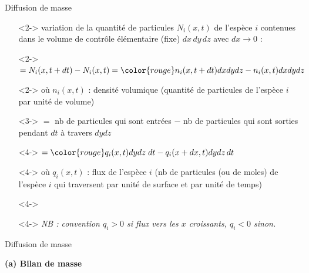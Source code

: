{\begin{frame}{Diffusion de masse}
\begin{overprint}
\end{overprint}

\vspace{-5mm}

\hspace{-5mm}
\begin{minipage}{110mm}
\begin{itemize}
\item[]<2->
variation de la quantité de particules $N_i(x, t)$  de l'espèce $i$ contenues dans le volume de contrôle élémentaire (fixe)
$dx\,dy\,dz$ avec $dx\rightarrow 0$ :
\item[]<2->
$= N_i(x, t+dt) - N_i(x, t) = \color{rouge} n_i(x, t+dt)dxdydz - n_i(x, t)dxdydz$
\item[\hspace{-10mm}]<2->
o\`u $n_i(x, t)$ : densité volumique (quantité de particules de l'espèce $i$ par unité de volume)
\item[]<3->
$=$ nb de particules qui sont entrées $-$ nb de particules qui sont sorties pendant $dt$ à travers $dydz$
\item[\hspace{-10mm}]<4->
$= \color{rouge} q_i(x, t) dydz \; dt - q_i(x+dx, t) dydz \, dt$
\item[]<4->
o\`u $q_i(x, t)$ : flux de l'espèce $i$ (nb de particules (ou de moles) de l'espèce $i$ qui traversent par unité de surface et par unité de temps)
\item[]<4->
\item[]<4->
\hfill \slshape \color{bleu} 
	NB : convention $q_i>0$ si flux vers les $x$ croissants, $q_i<0$ sinon.
\end{itemize}
\end{minipage}



\vspace{0.4mm}

\end{frame}

\begin{frame}{Diffusion de masse}

\small


\textbf{(a) Bilan de masse}


\end{frame}}
